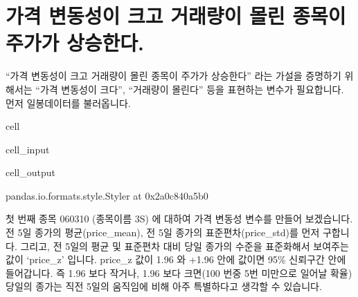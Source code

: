 \documentclass[letterpaper,10pt,english]{jupyterBook}
\begin{document}
\part{가격 변동성이 크고 거래량이 몰린 종목이 주가가 상승한다.}
\label{\detokenize{chapter5/5.1.1_Hypothesis_1:id1}}\label{\detokenize{chapter5/5.1.1_Hypothesis_1::doc}}
\sphinxAtStartPar
“가격 변동성이 크고 거래량이 몰린 종목이 주가가 상승한다” 라는 가설을 증명하기 위해서는 “가격 변동성이 크다”, “거래량이 몰린다” 등을 표현하는 변수가 필요합니다. 먼저 일봉데이터를 불러옵니다.

\begin{sphinxuseclass}{cell}\begin{sphinxVerbatimInput}

\begin{sphinxuseclass}{cell_input}
\begin{sphinxVerbatim}[commandchars=\\\{\}]
  
\end{sphinxVerbatim}

\end{sphinxuseclass}\end{sphinxVerbatimInput}
\begin{sphinxVerbatimOutput}

\begin{sphinxuseclass}{cell_output}
\begin{sphinxVerbatim}[commandchars=\\\{\}]
\PYGZlt{}pandas.io.formats.style.Styler at 0x2a0c840a5b0\PYGZgt{}
\end{sphinxVerbatim}

\end{sphinxuseclass}\end{sphinxVerbatimOutput}

\end{sphinxuseclass}
\sphinxAtStartPar
첫 번째 종목 060310 (종목이름 3S) 에 대하여 가격 변동성 변수를 만들어 보겠습니다. 전 5일 종가의 평균(price\_mean), 전 5일 종가의 표준편차(price\_std)를 먼저 구합니다. 그리고, 전 5일의 평균 및 표준편차 대비 당일 종가의 수준을 표준화해서 보여주는 값이 ‘price\_z’ 입니다. price\_z 값이 \sphinxhyphen{}1.96 와 +1.96 안에 값이면 95\% 신뢰구간 안에 들어갑니다. 즉 \sphinxhyphen{}1.96 보다 작거나, 1.96 보다 크면(100 번중 5번 미만으로 일어날 확율) 당일의 종가는 직전 5일의 움직임에 비해 아주 특별하다고 생각할 수 있습니다.
\end{document}
